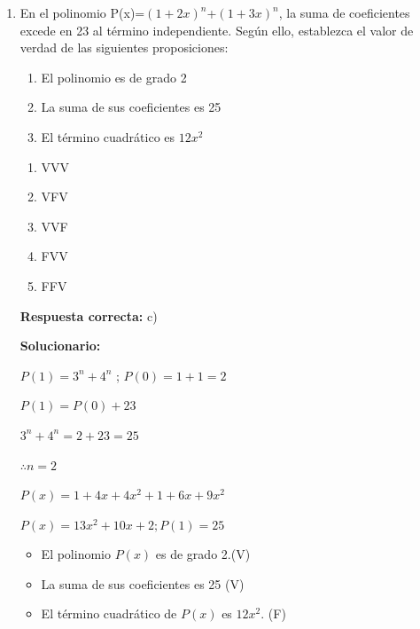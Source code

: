 \begin{enumerate}[resume]
	
	\item En el polinomio P(x)=$(1+2x)^n$+$(1+3x)^n$, la suma de coeficientes excede en 23 al término independiente. Según ello, establezca el valor de verdad de las siguientes proposiciones:
	\begin{enumerate}[label=\Roman*.]
		\item El polinomio es de grado 2
		\item La suma de sus coeficientes es 25
		\item El término cuadrático es $12x^2$
	\end{enumerate}
	
	
	\begin{enumerate}[label=\alph*)]
		\item VVV
		\item VFV
		\item VVF
		\item FVV
		\item FFV
	\end{enumerate}
	
	\textbf{Respuesta correcta:} c)
	
	\vspace{2mm}
	\textbf{Solucionario:}
	
	$P(1)=3^n+4^n$ ; $P(0)=1+1=2$
	
	$P(1)=P(0)+23$
	
	$3^n+4^n=2+23=25$
	
	$\therefore n = 2$
	
	$P(x)=1+4x+4x^2+1+6x+9x^2$
	
	$P(x)=13x^2+10x+2; P(1)=25$
	
	\begin{itemize}[label=*]
		\item El polinomio $P(x)$ es de grado 2.(V)
		\item La suma de sus coeficientes es 25 (V)
		\item El término cuadrático de $P(x)$ es $12x^2$. (F)
	\end{itemize}
	
	
	
	
\end{enumerate}

